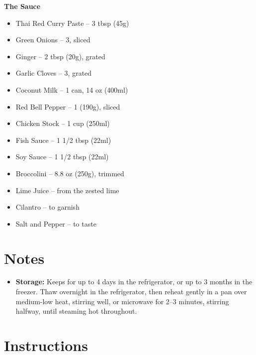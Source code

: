 \textbf{The Sauce}
\begin{itemize}[itemsep=0.1em, label={\raisebox{-0.1ex}{\large\textbullet}}]
      \item[\measure] Thai Red Curry Paste – 3 tbsp (45g)
      \item[\cut] Green Onions – 3, sliced
      \item[\cut] Ginger – 2 tbsp (20g), grated
      \item[\cut] Garlic Cloves – 3, grated
      \item Coconut Milk – 1 can, 14 oz (400ml)
      \item[\cut] Red Bell Pepper – 1 (190g), sliced
      \item[\measure] Chicken Stock – 1 cup (250ml)
      \item[\measure] Fish Sauce – 1 1/2 tbsp (22ml)
      \item[\measure] Soy Sauce – 1 1/2 tbsp (22ml)
      \item[\cut] Broccolini – 8.8 oz (250g), trimmed
      \item[\measure] Lime Juice – from the zested lime
      \item[\cut] Cilantro – to garnish
      \item Salt and Pepper – to taste
\end{itemize}

\section*{Notes}

\begin{itemize}
      \item \textbf{Storage:} Keeps for up to 4 days in the refrigerator, or up to 3 months in the freezer. Thaw overnight in the refrigerator, then reheat gently in a pan over medium-low heat, stirring well, or microwave for 2--3 minutes, stirring halfway, until steaming hot throughout.
\end{itemize}

\newpage
{}
\section*{Instructions}


